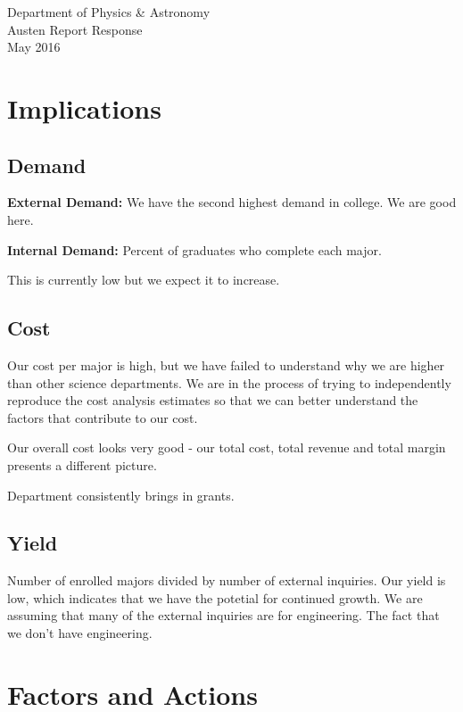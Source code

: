 \documentclass[12pt]{article}
\begin{document}
\begin{center}
{ \Large Department of Physics \& Astronomy \\ \medskip Austen Report Response \\ \medskip May 2016}
\end{center}
\section{Implications}

\subsection{Demand}

{\bf External Demand:}  We have the second highest demand in college.
We are good here.


{\bf Internal Demand:} Percent of graduates who complete each major.

This is currently low but we expect it to increase.

\subsection{Cost}

Our cost per major is high, but we have failed to understand why we are higher than other science departments.  
We are in the process of trying to independently reproduce the cost analysis estimates so that we
can better understand the factors that contribute to our cost.

Our overall cost looks very good - our total cost, total revenue and total margin presents a different picture.  

Department consistently brings in grants.  

\subsection{Yield}

Number of enrolled majors divided by number of external inquiries.  Our yield is low, which indicates that we have 
the potetial for continued growth.  We are assuming that many of the external inquiries are for engineering.  The fact that 
we don't have engineering.  

\section{Factors and Actions}
\end{document}
